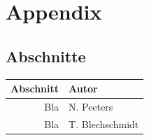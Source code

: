 \documentclass[a4paper]{article}
\begin{document}
    \clearpage
    \section{Appendix}
        \printglossary[type=\acronymtype]
        \printglossary
        
        \clearpage
        \nocite{*}
        
        
        
        \clearpage
        
        \subsection{Abschnitte}
            \begin{tabular}{rl}
              Abschnitt & Autor \\
              \hline
              Bla & N. Peeters\\
              Bla & T. Blechschmidt
            \end{tabular}
        
%                
\end{document}

